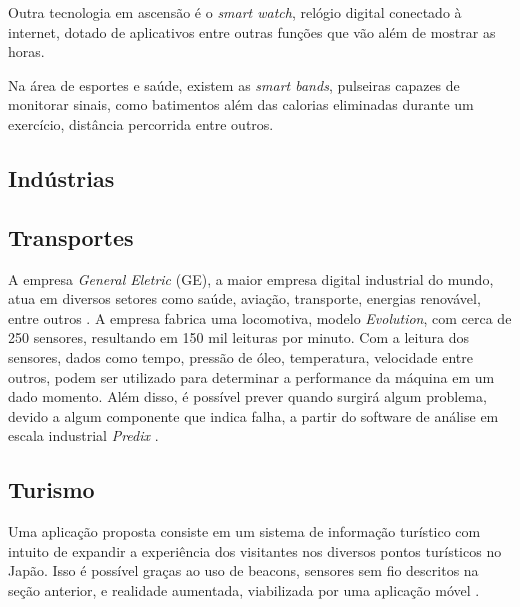 Outra tecnologia em ascensão é o \textit{smart watch}, relógio digital conectado à internet, dotado de aplicativos entre outras funções que vão além de mostrar as horas.

Na área de esportes e saúde, existem as \textit{smart bands}, pulseiras capazes de monitorar sinais, como batimentos além das calorias eliminadas durante um exercício, distância percorrida entre outros.


\subsection{Indústrias}


\subsection{Transportes}


A empresa \textit{General Eletric} (GE), a maior empresa digital industrial do mundo, atua em diversos setores como saúde, aviação, transporte, energias renovável, entre outros \cite{generalelectric2017} . A empresa fabrica uma locomotiva, modelo \textit{Evolution}, com cerca de 250 sensores, resultando em 150 mil leituras por minuto. Com a leitura dos sensores, dados como tempo, pressão de óleo, temperatura, velocidade entre outros, podem ser utilizado para determinar a performance da máquina em um dado momento. Além disso, é possível prever quando surgirá algum problema, devido a algum componente que indica falha, a partir do software de análise em escala industrial \textit{Predix} \cite{danielterdiman2014}.


\subsection{Turismo}
Uma aplicação proposta consiste em um sistema de informação turístico com intuito de expandir a experiência dos visitantes nos diversos pontos turísticos no Japão. Isso é possível graças ao uso de beacons, sensores sem fio descritos na seção anterior, e realidade aumentada, viabilizada por uma aplicação móvel \cite{SHIBATA2016}. 
